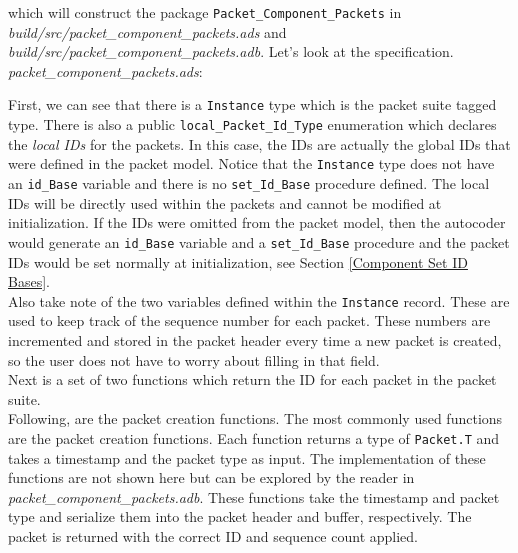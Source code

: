 which will construct the package \texttt{Packet\_Component\_Packets} in \textit{build/src/packet\_component\_packets.ads} and \textit{build/src/packet\_component\_packets.adb}. Let's look at the specification. \\

\textit{packet\_component\_packets.ads}:

First, we can see that there is a \texttt{Instance} type which is the packet suite tagged type. There is also a public \texttt{local\_Packet\_Id\_Type} enumeration which declares the \textit{local IDs} for the packets. In this case, the IDs are actually the global IDs that were defined in the packet model. Notice that the \texttt{Instance} type does not have an \texttt{id\_Base} variable and there is no \texttt{set\_Id\_Base} procedure defined. The local IDs will be directly used within the packets and cannot be modified at initialization. If the IDs were omitted from the packet model, then the autocoder would generate an \texttt{id\_Base} variable and a \texttt{set\_Id\_Base} procedure and the packet IDs would be set normally at initialization, see Section \ref{Component Set ID Bases}. \\

Also take note of the two variables defined within the \texttt{Instance} record. These are used to keep track of the sequence number for each packet. These numbers are incremented and stored in the packet header every time a new packet is created, so the user does not have to worry about filling in that field. \\

Next is a set of two functions which return the ID for each packet in the packet suite. \\

Following, are the packet creation functions. The most commonly used functions are the packet creation functions. Each function returns a type of \texttt{Packet.T} and takes a timestamp and the packet type as input. The implementation of these functions are not shown here but can be explored by the reader in \textit{packet\_component\_packets.adb}. These functions take the timestamp and packet type and serialize them into the packet header and buffer, respectively. The packet is returned with the correct ID and sequence count applied. \\

